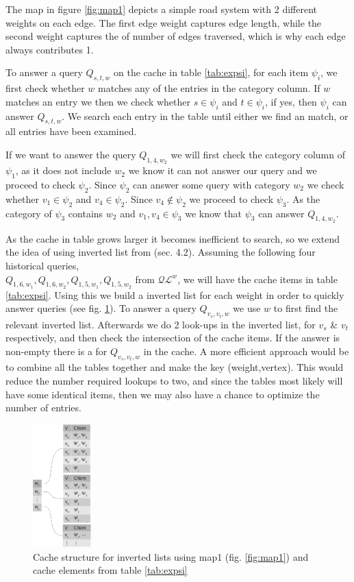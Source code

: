 The map in figure \ref{fig:map1} depicts a simple road system with 2 different weights on each edge. The first edge weight captures edge length, while the second weight captures the of number of edges traversed, which is why each edge always contributes 1.

To answer a query $Q_{s,t,w}$ on the cache in table \ref{tab:expsi}, for each item $\psi_i$, we first check whether $w$ matches any of the entries in the category column. If $w$ matches an entry we then we check whether $s \in \psi_i$ and $t \in \psi_i$, if yes, then $\psi_i$ can answer $Q_{s,t,w}$. We search each entry in the table until either we find an match, or all entries have been examined.

If we want to answer the query $Q_{1,4,w_2}$ we will first check the category column of $\psi_1$, as it does not include $w_2$ we know it can not answer our query and we proceed to check $\psi_2$. Since $\psi_2$ can answer some query with category $w_2$ we check whether $v_1 \in \psi_2$ and $v_4 \in \psi_2$. Since $v_4 \not \in \psi_2$ we proceed to check $\psi_3$. As the category of $\psi_3$ contains $w_2$ and $v_1, v_4 \in \psi_3$ we know that $\psi_3$ can answer $Q_{1,4,w_2}$.

As the cache in table grows larger it becomes inefficient to search, so we extend the idea of using inverted list from \cite{thomsen2012}(sec. 4.2). Assuming the following four historical queries, \\
$Q_{1,6,w_1},Q_{1,6,w_2}, Q_{1,5,w_1},Q_{1,5,w_2}$ from $\mathcal{QL}^{w}$, we will have the cache items in table \ref{tab:expsi}. Using this we build a inverted list for each weight in order to quickly answer queries (see fig. \ref{fig:wilist}). 
To answer a query $Q_{v_s,v_t,w}$ we use $w$ to first find the relevant inverted list. Afterwards we do 2 look-ups in the inverted list, for $v_s$ \& $v_t$ respectively, and then check the intersection of the cache items. If the answer is non-empty there is a \spath for $Q_{v_s,v_t,w}$ in the cache. 
A more efficient approach would be to combine all the tables together and make the key (weight,vertex). This would reduce the number required lookups to two, and since the tables most likely will have some identical items, then we may also have a chance to optimize the number of entries.

\begin{figure}[hbt]
  \center
        \includegraphics[width=0.20\textwidth]{figures/wilist}
        \caption{Cache structure for inverted lists using map1 (fig. \ref{fig:map1}) and cache elements from table \ref{tab:expsi}}
  \label{fig:wilist}
\end{figure}


